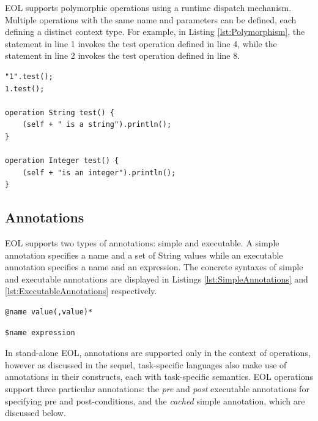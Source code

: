 EOL supports polymorphic operations using a runtime dispatch mechanism. Multiple operations with the same name and parameters can be defined, each defining a distinct context type. For example, in Listing \ref{lst:Polymorphism}, the statement in line 1 invokes the test operation defined in line 4, while the statement in line 2 invokes the test operation defined in line 8.

\begin{lstlisting}[basicstyle=\ttfamily\footnotesize, flexiblecolumns=true, numbers=none, nolol=true, caption=Demonstration of polymorphism in EOL, label=lst:Polymorphism, numbers=left, language=EOL, tabsize=2]
"1".test();
1.test();

operation String test() {
	(self + " is a string").println();
}

operation Integer test() {
	(self + "is an integer").println();
}

\end{lstlisting}

\subsection{Annotations}
\label{sec:Design.EOL.Annotations}
EOL supports two types of annotations: simple and executable. A simple annotation specifies a name and a set of String values while an executable annotation specifies a name and an expression. The concrete syntaxes of simple and executable annotations are displayed in Listings \ref{lst:SimpleAnnotations} and \ref{lst:ExecutableAnnotations} respectively.

\begin{lstlisting}[basicstyle=\ttfamily\footnotesize, flexiblecolumns=true, numbers=none, nolol=true, caption=Concrete syntax of simple annotations, label=lst:SimpleAnnotations, language=EOL, tabsize=2]
@name value(,value)*
\end{lstlisting}

\begin{lstlisting}[basicstyle=\ttfamily\footnotesize, flexiblecolumns=true, numbers=none, nolol=true, caption=Concrete syntax of executable annotations, label=lst:ExecutableAnnotations, language=EOL, tabsize=2]
$name expression
\end{lstlisting}

In stand-alone EOL, annotations are supported only in the context of operations, however as discussed in the sequel, task-specific languages also make use of annotations in their constructs, each with task-specific semantics. EOL operations support three particular annotations: the \emph{pre} and \emph{post} executable annotations for specifying pre and post-conditions, and the \emph{cached} simple annotation, which are discussed below.


